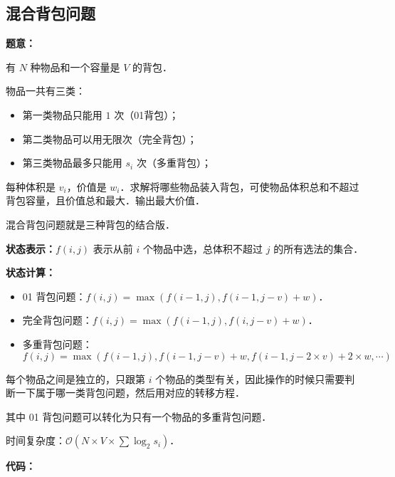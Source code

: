 \subsection{混合背包问题}

\textbf{题意：}

有 $N$ 种物品和一个容量是 $V$ 的背包．

物品一共有三类：

\begin{itemize}
\item 第一类物品只能用 $1$ 次（01背包）；
\item 第二类物品可以用无限次（完全背包）；
\item 第三类物品最多只能用 $s_i$ 次（多重背包）；
\end{itemize}

每种体积是 $v_i$，价值是 $w_i$．求解将哪些物品装入背包，可使物品体积总和不超过背包容量，且价值总和最大．输出最大价值．

混合背包问题就是三种背包的结合版．

\textbf{状态表示：$f(i, j)$} 表示从前 $i$ 个物品中选，总体积不超过 $j$ 的所有选法的集合．

\textbf{状态计算：}

\begin{itemize}
\item 01 背包问题：$f(i, j) = \max(f(i - 1, j), f(i - 1, j - v) + w)$．
\item 完全背包问题：$f(i, j) = \max(f(i - 1, j), f(i, j - v) + w)$．
\item 多重背包问题：
\begin{equation}
f(i, j) = \max(f(i - 1, j), f(i - 1, j - v) + w, f(i - 1, j - 2 \times v) + 2 \times w , \cdots)
\end{equation}
\end{itemize}

每个物品之间是独立的，只跟第 $i$ 个物品的类型有关，因此操作的时候只需要判断一下属于哪一类背包问题，然后用对应的转移方程．

其中 01 背包问题可以转化为只有一个物品的多重背包问题．

时间复杂度：$\mathcal{O}(N \times V \times \sum \log_2 s_i)$．

\textbf{代码：}


